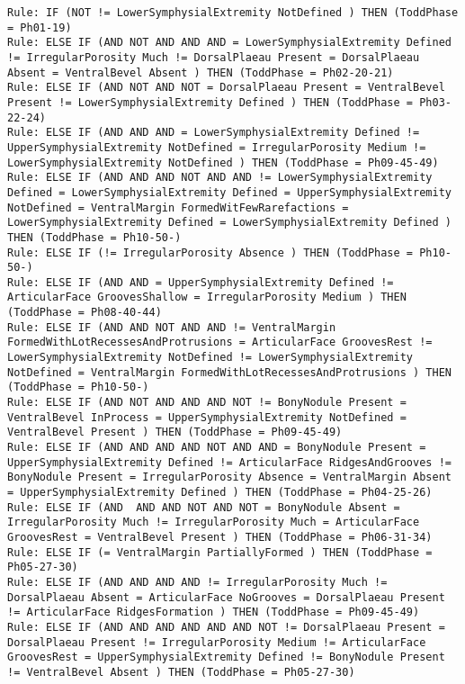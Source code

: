 \begin{lstlisting}
Rule: IF (NOT != LowerSymphysialExtremity NotDefined ) THEN (ToddPhase = Ph01-19)
Rule: ELSE IF (AND NOT AND AND AND = LowerSymphysialExtremity Defined != IrregularPorosity Much != DorsalPlaeau Present = DorsalPlaeau Absent = VentralBevel Absent ) THEN (ToddPhase = Ph02-20-21)
Rule: ELSE IF (AND NOT AND NOT = DorsalPlaeau Present = VentralBevel Present != LowerSymphysialExtremity Defined ) THEN (ToddPhase = Ph03-22-24)
Rule: ELSE IF (AND AND AND = LowerSymphysialExtremity Defined != UpperSymphysialExtremity NotDefined = IrregularPorosity Medium != LowerSymphysialExtremity NotDefined ) THEN (ToddPhase = Ph09-45-49)
Rule: ELSE IF (AND AND AND NOT AND AND != LowerSymphysialExtremity Defined = LowerSymphysialExtremity Defined = UpperSymphysialExtremity NotDefined = VentralMargin FormedWitFewRarefactions = LowerSymphysialExtremity Defined = LowerSymphysialExtremity Defined ) THEN (ToddPhase = Ph10-50-)
Rule: ELSE IF (!= IrregularPorosity Absence ) THEN (ToddPhase = Ph10-50-)
Rule: ELSE IF (AND AND = UpperSymphysialExtremity Defined != ArticularFace GroovesShallow = IrregularPorosity Medium ) THEN (ToddPhase = Ph08-40-44)
Rule: ELSE IF (AND AND NOT AND AND != VentralMargin FormedWithLotRecessesAndProtrusions = ArticularFace GroovesRest != LowerSymphysialExtremity NotDefined != LowerSymphysialExtremity NotDefined = VentralMargin FormedWithLotRecessesAndProtrusions ) THEN (ToddPhase = Ph10-50-)
Rule: ELSE IF (AND NOT AND AND AND NOT != BonyNodule Present = VentralBevel InProcess = UpperSymphysialExtremity NotDefined = VentralBevel Present ) THEN (ToddPhase = Ph09-45-49)
Rule: ELSE IF (AND AND AND AND NOT AND AND = BonyNodule Present = UpperSymphysialExtremity Defined != ArticularFace RidgesAndGrooves != BonyNodule Present = IrregularPorosity Absence = VentralMargin Absent = UpperSymphysialExtremity Defined ) THEN (ToddPhase = Ph04-25-26)
Rule: ELSE IF (AND  AND AND NOT AND NOT = BonyNodule Absent = IrregularPorosity Much != IrregularPorosity Much = ArticularFace GroovesRest = VentralBevel Present ) THEN (ToddPhase = Ph06-31-34)
Rule: ELSE IF (= VentralMargin PartiallyFormed ) THEN (ToddPhase = Ph05-27-30)
Rule: ELSE IF (AND AND AND AND != IrregularPorosity Much != DorsalPlaeau Absent = ArticularFace NoGrooves = DorsalPlaeau Present != ArticularFace RidgesFormation ) THEN (ToddPhase = Ph09-45-49)
Rule: ELSE IF (AND AND AND AND AND AND NOT != DorsalPlaeau Present = DorsalPlaeau Present != IrregularPorosity Medium != ArticularFace GroovesRest = UpperSymphysialExtremity Defined != BonyNodule Present != VentralBevel Absent ) THEN (ToddPhase = Ph05-27-30)

\end{lstlisting}
